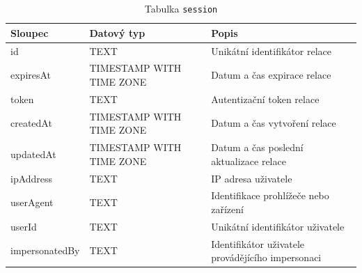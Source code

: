 \begin{table}[ht!]
    \centering
    \begin{tabularx}{\textwidth}{|l|l|L|}
        \hline
        \textbf{Sloupec} & \textbf{Datový typ}      & \textbf{Popis}                                    \\ \hline
        id               & TEXT                     & Unikátní identifikátor relace                     \\ \hline
        expiresAt        & TIMESTAMP WITH TIME ZONE & Datum a čas expirace relace                       \\ \hline
        token            & TEXT                     & Autentizační token relace                         \\ \hline
        createdAt        & TIMESTAMP WITH TIME ZONE & Datum a čas vytvoření relace                      \\ \hline
        updatedAt        & TIMESTAMP WITH TIME ZONE & Datum a čas poslední aktualizace relace           \\ \hline
        ipAddress        & TEXT                     & IP adresa uživatele                               \\ \hline
        userAgent        & TEXT                     & Identifikace prohlížeče nebo zařízení             \\ \hline
        userId           & TEXT                     & Unikátní identifikátor uživatele                  \\ \hline
        impersonatedBy   & TEXT                     & Identifikátor uživatele provádějícího impersonaci \\ \hline
    \end{tabularx}
    \caption{Tabulka \texttt{session}}
    \label{tab:session}
\end{table}
